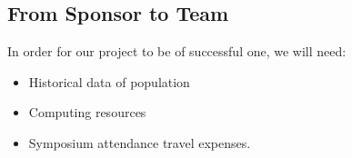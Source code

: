 \documentclass[12pt,letterpaper]{article}
\theoremstyle{definition}
\begin{document}
\subsection{From Sponsor to Team} %

In order for our project to be of successful one, we will need:
\begin{itemize}
    \item Historical data of population
    \item Computing resources
    \item Symposium attendance travel expenses.
\end{itemize}
\end{document}
